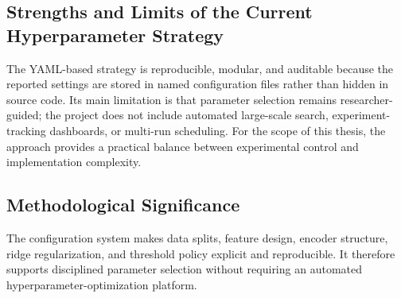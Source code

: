 \subsection{Strengths and Limits of the Current Hyperparameter Strategy}

The YAML-based strategy is reproducible, modular, and auditable because the reported settings are stored in named configuration files rather than hidden in source code. Its main limitation is that parameter selection remains researcher-guided; the project does not include automated large-scale search, experiment-tracking dashboards, or multi-run scheduling. For the scope of this thesis, the approach provides a practical balance between experimental control and implementation complexity.

\subsection{Methodological Significance}

The configuration system makes data splits, feature design, encoder structure, ridge regularization, and threshold policy explicit and reproducible. It therefore supports disciplined parameter selection without requiring an automated hyperparameter-optimization platform.

